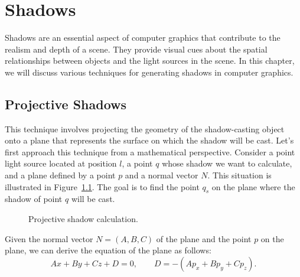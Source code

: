 \chapter{Shadows}

Shadows are an essential aspect of computer graphics that contribute to the realism and depth of a scene. They provide visual cues about the spatial relationships between objects and the light sources in the scene. In this chapter, we will discuss various techniques for generating shadows in computer graphics.

\section{Projective Shadows}

This technique involves projecting the geometry of the shadow-casting object onto a plane that represents the surface on which the shadow will be cast. Let's first approach this technique from a mathematical perspective. Consider a point light source located at position $l$, a point $q$ whose shadow we want to calculate, and a plane defined by a point $p$ and a normal vector $N$. This situation is illustrated in Figure~\ref{fig:projective-shadow}. The goal is to find the point $q_s$ on the plane where the shadow of point $q$ will be cast.
\begin{figure}
    \centering
    \caption{Projective shadow calculation.}
    \label{fig:projective-shadow}
\end{figure}

Given the normal vector $N=(A,B,C)$ of the plane and the point $p$ on the plane, we can derive the equation of the plane as follows:
\begin{equation*}
    Ax + By + Cz + D = 0,\qquad D=-(Ap_x + Bp_y + Cp_z).
\end{equation*}

